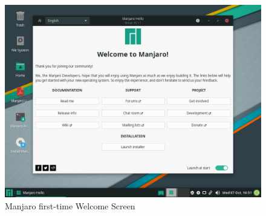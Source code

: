 \documentclass{article}
\begin{document}
\begin{figure}[ht!]
\begin{minipage}{0.5\textwidth}
        \includegraphics[width=.95\linewidth]{images/This_screen_means_you_can_explore_manjaro_before_you_destroy_windows.png}
        \caption{Manjaro first-time Welcome Screen}
        \label{fig:welcomeManjaro}
    \end{minipage}\hfill
\end{figure}
\end{document}
